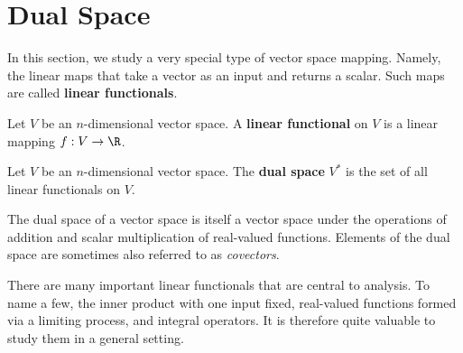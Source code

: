 \section{Dual Space}
In this section, we study a very special type of vector space mapping. Namely, the linear maps that take a vector as an input and returns a scalar. Such maps are called \textbf{linear functionals}.
\begin{definition}
  Let \( V \) be an \( n \)-dimensional vector space. A \textbf{linear functional} on \( V \) is a linear mapping \( f:V\to\R \).
\end{definition}

\begin{definition}
  Let \( V \) be an \( n \)-dimensional vector space. The \textbf{dual space} \( V^* \) is the set of all linear functionals on \( V \).
\end{definition}

The dual space of a vector space is itself a vector space under the operations of addition and scalar multiplication of real-valued functions. Elements of the dual space are sometimes also referred to as \emph{covectors}.

\vspace{3mm}

There are many important linear functionals that are central to analysis. To name a few, the inner product with one input fixed, real-valued functions formed via a limiting process, and integral operators. It is therefore quite valuable to study them in a general setting.

\vspace{3mm}

